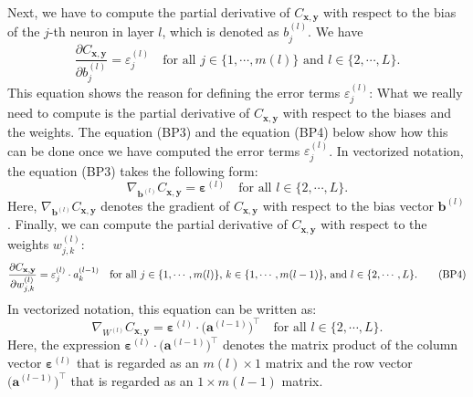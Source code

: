 Next, we have to compute the partial derivative of $C_{\mathbf{x}, \mathbf{y}}$ with respect to the bias of the
$j$-th neuron in layer $l$, which is denoted as $b_j^{(l)}$.  We have
\begin{equation}
  \label{eq:BP3}
  \frac{\partial C_{\mathbf{x}, \mathbf{y}}}{\partial b_j^{(l)}} = \varepsilon_j^{(l)}
  \quad \mbox{for all $j \in \{1,\cdots,m(l)\}$ and $l \in \{2, \cdots,L\}$.}
  \tag{BP3}
\end{equation}
This equation shows the reason for defining the error terms $\varepsilon_j^{(l)}$:  What we really need to
compute is the partial derivative of $C_{\mathbf{x},\mathbf{y}}$ with respect to the biases and the weights.
The equation (BP3) and the equation (BP4) below show how this can be done once we have computed the error terms
$\varepsilon_j^{(l)}$.  In vectorized notation, the equation (BP3) takes the following form:
\begin{equation}
  \label{eq:BP3v}
  \nabla_{\mathbf{b}^{(l)}} C_{\mathbf{x}, \mathbf{y}} = \boldsymbol{\varepsilon}^{(l)}
  \quad \mbox{for all $l \in \{2, \cdots,L\}$.}
  \tag{BP3v}
\end{equation}
Here, $\nabla_{\mathbf{b}^{(l)}} C_{\mathbf{x}, \mathbf{y}}$ denotes the gradient of $C_{\mathbf{x},
  \mathbf{y}}$ with respect to the bias vector $\mathbf{b}^{(l)}$.
Finally, we can compute the  partial derivative of $C_{\mathbf{x}, \mathbf{y}}$ with respect to the weights $w_{j,k}^{(l)}$:
\begin{equation}
  \label{eq:BP4}
  \frac{\partial C_{\mathbf{x}, \mathbf{y}}}{\partial w_{j,k}^{(l)}} = \varepsilon_j^{(l)} \cdot a_k^{(l-1)} 
  \quad \mbox{for all $j \in \{1,\cdots,m(l)\}$, $ k \in \{1,\cdots,m(l-1)\}$, and $l \in \{2, \cdots,L\}$.}
  \tag{BP4}
\end{equation}
In vectorized notation, this equation can be written as:
\begin{equation}
  \label{eq:BP4v}
  \nabla_{W^{(l)}} C_{\mathbf{x}, \mathbf{y}} = \boldsymbol{\varepsilon}^{(l)} \cdot \bigl(\mathbf{a}^{(l-1)}\bigr)^\top
  \quad \mbox{for all $l \in \{2, \cdots,L\}$.}
  \tag{BP4v}
\end{equation}
Here, the expression $\boldsymbol{\varepsilon}^{(l)} \cdot \bigl(\mathbf{a}^{(l-1)}\bigr)^\top$ denotes the matrix
product of the column vector $\boldsymbol{\varepsilon}^{(l)}$ that is regarded as an $m(l) \times 1$ matrix and the
row vector $\bigl(\mathbf{a}^{(l-1)}\bigr)^\top$ that is regarded as an $1 \times m(l-1)$ matrix.

